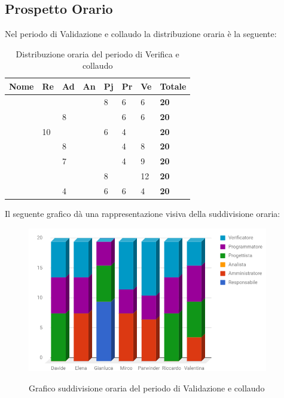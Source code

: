 \documentclass[PianoDiProgetto.tex]{subfiles}
\begin{document}
\subsection{Prospetto Orario}
Nel periodo di Validazione e collaudo la distribuzione oraria è la seguente:
\begin{center}
	\begin{table}[htbp]
		\centering
		\renewcommand\arraystretch{1.5}
		\begin{tabularx}{\textwidth}{p{4cm}|p{1cm}|p{1cm}|p{1cm}|p{1cm}|p{1cm}|p{1cm}|p{2cm}}
			\hline
			\textbf{Nome} & \textbf{Re} & \textbf{Ad} & \textbf{An} & \textbf{Pj} & \textbf{Pr} & \textbf{Ve} & \textbf{Totale} \\
			\hline
			\Davide & \ & \ & \ & 8 & 6 & 6 & \textbf{20} \\
			\hline
			\Elena & \ & 8 & \ & \ & 6 & 6 & \textbf{20} \\
			\hline
			\Gianluca & 10 & \ & \ & 6 & 4 & \ & \textbf{20} \\
			\hline
			\Mirco & \ & 8 & \ & \ & 4 & 8 & \textbf{20} \\
			\hline
			\Parwinder & \ & 7 & \ & \ & 4 & 9 & \textbf{20} \\
			\hline
			\Riccardo & \ & \ & \ & 8 & \ & 12 & \textbf{20} \\
			\hline
			\Valentina & \ & 4 & \ & 6 & 6 & 4 & \textbf{20} \\
			\hline
		\end{tabularx}
	\caption{Distribuzione oraria del periodo di Verifica e collaudo}
	\label{my-label}
	\end{table} 	
\end{center}
Il seguente grafico dà una rappresentazione visiva della suddivisione oraria:
\begin{figure}[h]
	\centering
	\includegraphics[width=10.5cm]{images/prospettoOrario/valCol.png}
	\label{fig:foo}
	\caption{Grafico suddivisione oraria del periodo di Validazione e collaudo}
\end{figure} 
\newpage
\end{document}
